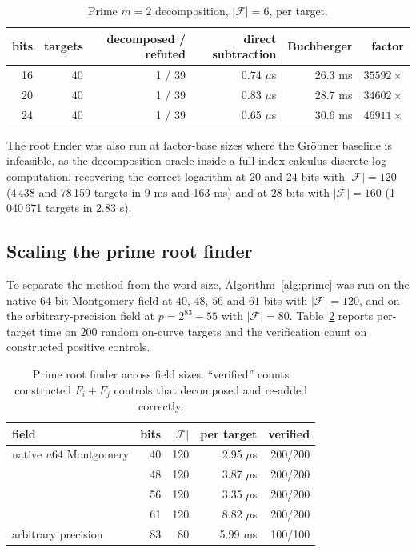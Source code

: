\documentclass[10pt,a4paper]{article}
\theoremstyle{remark}
\newcommand{\Fb}{\mathcal{F}}
\newcommand{\abs}[1]{\lvert #1 \rvert}
\begin{document}
\begin{table}[h]
\centering
\caption{Prime $m=2$ decomposition, $\abs{\Fb}=6$, per target.}
\label{tab:prime-small}
\begin{tabular}{@{}rrrrrr@{}}
\toprule
bits & targets & decomposed / refuted & direct subtraction & Buchberger & factor \\
\midrule
16 & 40 & 1 / 39 & 0.74 $\mu$s & 26.3 ms & $35592\times$ \\
20 & 40 & 1 / 39 & 0.83 $\mu$s & 28.7 ms & $34602\times$ \\
24 & 40 & 1 / 39 & 0.65 $\mu$s & 30.6 ms & $46911\times$ \\
\bottomrule
\end{tabular}
\end{table}

The root finder was also run at factor-base sizes where the Gr\"obner
baseline is infeasible, as the decomposition oracle inside a full
index-calculus discrete-log computation, recovering the correct
logarithm at $20$ and $24$ bits with $\abs{\Fb} = 120$ (4\,438 and
78\,159 targets in 9 ms and 163 ms) and at $28$ bits with
$\abs{\Fb} = 160$ (1\,040\,671 targets in 2.83 s).

\subsection{Scaling the prime root finder}
\label{sec:exp-scaling}

To separate the method from the word size, Algorithm~\ref{alg:prime}
was run on the native $64$-bit Montgomery field at $40$, $48$, $56$ and
$61$ bits with $\abs{\Fb} = 120$, and on the arbitrary-precision field
at $p = 2^{83} - 55$ with $\abs{\Fb} = 80$. Table~\ref{tab:scaling}
reports per-target time on $200$ random on-curve targets and the
verification count on constructed positive controls.

\begin{table}[h]
\centering
\caption{Prime root finder across field sizes. ``verified'' counts
constructed $F_i + F_j$ controls that decomposed and re-added correctly.}
\label{tab:scaling}
\begin{tabular}{@{}lrrrr@{}}
\toprule
field & bits & $\abs{\Fb}$ & per target & verified \\
\midrule
native $u64$ Montgomery & 40 & 120 & 2.95 $\mu$s & 200/200 \\
                        & 48 & 120 & 3.87 $\mu$s & 200/200 \\
                        & 56 & 120 & 3.35 $\mu$s & 200/200 \\
                        & 61 & 120 & 8.82 $\mu$s & 200/200 \\
\addlinespace
arbitrary precision     & 83 & 80  & 5.99 ms     & 100/100 \\
\bottomrule
\end{tabular}
\end{table}
\end{document}
